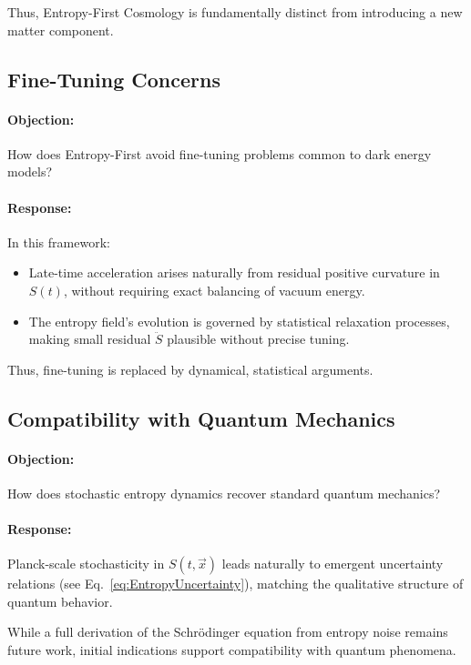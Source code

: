 \documentclass{article}
\begin{document}
Thus, Entropy-First Cosmology is fundamentally distinct from introducing a new matter component.



\subsection{Fine-Tuning Concerns}

\paragraph{Objection:}  
How does Entropy-First avoid fine-tuning problems common to dark energy models?

\paragraph{Response:}
In this framework:
\begin{itemize}
    \item Late-time acceleration arises naturally from residual positive curvature in $S(t)$, without requiring exact balancing of vacuum energy.
    \item The entropy field’s evolution is governed by statistical relaxation processes, making small residual $\ddot{S}$ plausible without precise tuning.
\end{itemize}

Thus, fine-tuning is replaced by dynamical, statistical arguments.



\subsection{Compatibility with Quantum Mechanics}

\paragraph{Objection:}  
How does stochastic entropy dynamics recover standard quantum mechanics?

\paragraph{Response:}
Planck-scale stochasticity in $S(t, \vec{x})$ leads naturally to emergent uncertainty relations (see Eq.~\eqref{eq:EntropyUncertainty}), matching the qualitative structure of quantum behavior.

While a full derivation of the Schrödinger equation from entropy noise remains future work, initial indications support compatibility with quantum phenomena.
\end{document}
